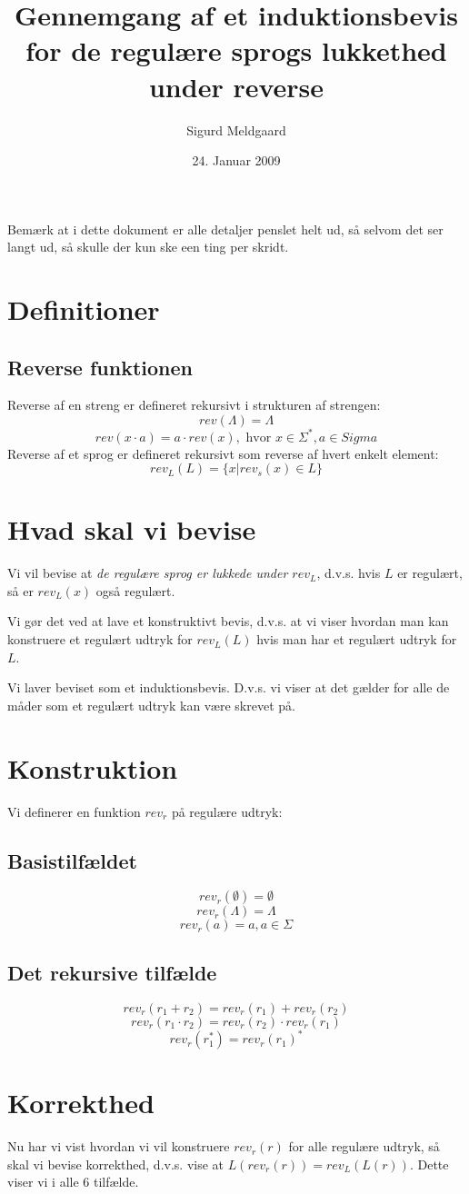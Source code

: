 \documentclass[11pt,a4paper]{article}
\title{Gennemgang af et induktionsbevis for de regulære sprogs lukkethed under reverse}
\author{Sigurd Meldgaard}
\date{24. Januar 2009}
\begin{document}
\maketitle
Bemærk at i dette dokument er alle detaljer penslet helt ud, så selvom
det ser langt ud, så skulle der kun ske een ting per skridt.
\section{Definitioner}
\subsection{Reverse funktionen}
Reverse af en streng er defineret rekursivt i strukturen af strengen:
\[rev(\Lambda) = \Lambda\]
\[rev(x\cdot a) = a\cdot rev(x), \text{ hvor } x\in \Sigma^*, a \in Sigma \]
Reverse af et sprog er defineret rekursivt som reverse af hvert enkelt element:
\[rev_L(L) = \{x | rev_s(x) \in L \} \]
\section{Hvad skal vi bevise}
Vi vil bevise at \emph{de regulære sprog er lukkede under $rev_L$}, d.v.s. hvis $L$ er regulært, så er $rev_L(x)$ også regulært.

Vi gør det ved at lave et konstruktivt bevis, d.v.s. at vi viser
hvordan man kan konstruere et regulært udtryk for $rev_L(L)$ hvis man
har et regulært udtryk for $L$.

Vi laver beviset som et induktionsbevis. D.v.s. vi viser at det gælder
for alle de måder som et regulært udtryk kan være skrevet på.
\section{Konstruktion}
Vi definerer en funktion $rev_r$ på regulære udtryk:
\subsection{Basistilfældet}
\[rev_r(\emptyset) = \emptyset\]
\[rev_r(\Lambda) = \Lambda\]
\[rev_r(a) = a, a\in\Sigma\]
\subsection{Det rekursive tilfælde}
\[rev_r(r_1 + r_2) = rev_r(r_1) + rev_r(r_2)\]
\[rev_r(r_1 \cdot r_2) = rev_r(r_2) \cdot rev_r(r_1)\]
\[rev_r(r_1^*) = rev_r(r_1)^*\]
\section{Korrekthed}
Nu har vi vist hvordan vi vil konstruere $rev_r(r)$ for alle regulære
udtryk, så skal vi bevise korrekthed, d.v.s. vise at $L(rev_r(r)) =
rev_L(L(r))$. Dette viser vi i alle 6 tilfælde.
\end{document}

